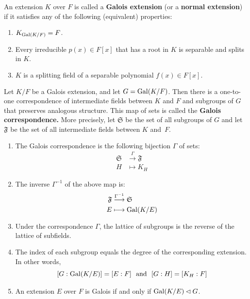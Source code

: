 \begin{definition}
    An extension $K$ over $F$ is called a \textbf{Galois extension} (or a \textbf{normal extension}) if it satisfies any of the following (equivalent) properties:
\begin{enumerate}
  \item $K_{\operatorname{Gal}(K/F)} = F$.
  \item Every irreducible $p(x)\in F[x]$ that has a root in $K$ is separable and splits in $K$.
  \item $K$ is a splitting field of a separable polynomial $f(x) \in F[x]$.
\end{enumerate}
\end{definition}
\begin{theorem}
    Let $K/F$ be a Galois extension, and let $G = \operatorname{Gal}(K/F)$.  Then there is a one-to-one correspondence of intermediate fields between $K$ and $F$ and subgroups of $G$ that preserves analogous structure.  This map of sets is called the \textbf{Galois correspondence.} More precisely, let $\mathfrak{S}$ be the set of all subgroups of $G$ and let $\mathfrak{F}$ be the set of all intermediate fields between $K$ and~$F$.
\begin{enumerate}
  \item The Galois correspondence is the following bijection $\Gamma$ of sets:
      \begin{align*}
          \mathfrak{S} &\stackrel{\Gamma}\longrightarrow \mathfrak{F} \\ H &\longmapsto K_H
      \end{align*}
  \item The inverse $\Gamma^{-1}$ of the above map is:
      \begin{align*} \mathfrak{F} &\stackrel{\Gamma^{-1}}\longrightarrow \mathfrak{S} \\ E &\longmapsto \operatorname{Gal}(K/E)
      \end{align*}
  \item Under the correspondence $\Gamma$, the lattice of subgroups is the reverse of the lattice of subfields.
  \item The index of each subgroup equals the degree of the corresponding extension.  In other words,
      $$[G:\operatorname{Gal}(K/E)] = [E:F] \,\,\mbox{ and }\,\, [G:H] = [K_H:F]$$
  \item An extension $E$ over $F$ is Galois if and only if $\operatorname{Gal}(K/E) \lhd G$.
\end{enumerate}
    \label{thm:galcorr}
\end{theorem}


